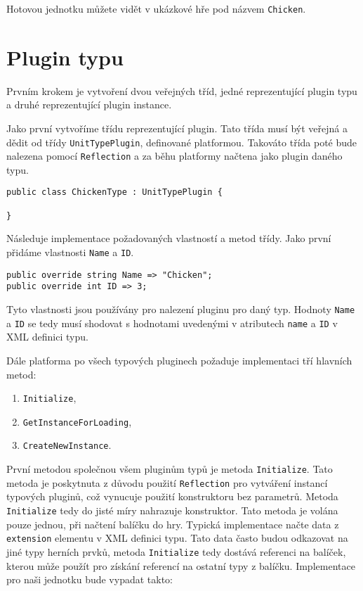 Hotovou jednotku můžete vidět v ukázkové hře pod názvem \texttt{Chicken}.

\section{Plugin typu}
Prvním krokem je vytvoření dvou veřejných tříd, jedné reprezentující plugin typu a druhé reprezentující plugin instance. 

Jako první vytvoříme třídu reprezentující plugin. Tato třída musí být veřejná a dědit od třídy \texttt{UnitTypePlugin}, definované platformou. Takováto třída poté bude nalezena pomocí \texttt{Reflection} a za běhu platformy načtena jako plugin daného typu.  

\begin{lstlisting}
public class ChickenType : UnitTypePlugin {

}
\end{lstlisting}

Následuje implementace požadovaných vlastností a metod třídy. Jako první přidáme vlastnosti \texttt{Name} a \texttt{ID}.
\begin{lstlisting}
public override string Name => "Chicken";
public override int ID => 3;
\end{lstlisting}

Tyto vlastnosti jsou používány pro nalezení pluginu pro daný typ. Hodnoty \texttt{Name} a \texttt{ID} se tedy musí shodovat s hodnotami uvedenými v atributech \texttt{name} a \texttt{ID} v XML definici typu.

Dále platforma po všech typových pluginech požaduje implementaci tří hlavních metod:

\begin{enumerate}
	\item \texttt{Initialize},
	\item \texttt{GetInstanceForLoading},
	\item \texttt{CreateNewInstance}.
\end{enumerate}


První metodou společnou všem pluginům typů je metoda \texttt{Initialize}. Tato metoda je poskytnuta z důvodu použití \texttt{Reflection} pro vytváření instancí typových pluginů, což vynucuje použití konstruktoru bez parametrů. Metoda \texttt{Initialize} tedy do jisté míry nahrazuje konstruktor. Tato metoda je volána pouze jednou, při načtení balíčku do hry. Typická implementace načte data z \texttt{extension} elementu v XML definici typu. Tato data často budou odkazovat na jiné typy herních prvků, metoda \texttt{Initialize} tedy dostává referenci na balíček, kterou může použít pro získání referencí na ostatní typy z balíčku. Implementace pro naši jednotku bude vypadat takto: 

